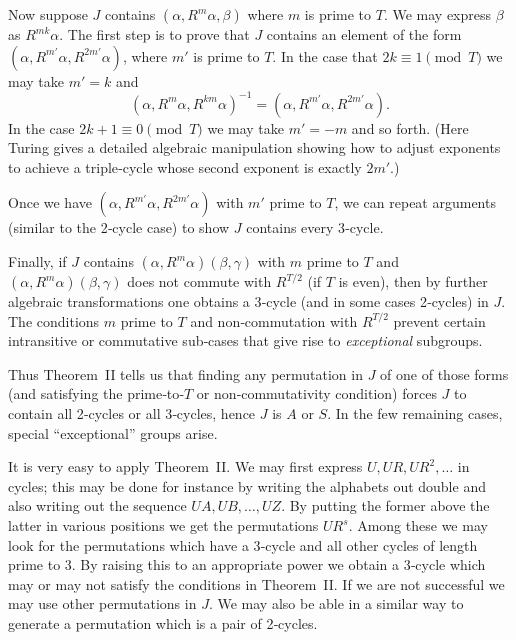 \documentclass[12pt]{article}
\begin{document}
\medskip

Now suppose $J$ contains $(\alpha, R^m \alpha, \beta)$ where $m$ is prime to $T$. We may express $\beta$ as $R^{mk}\alpha$. The first step is to prove that $J$ contains an element of the form $(\alpha, R^{m'}\alpha, R^{2m'}\alpha)$, where $m'$ is prime to $T$. In the case that $2k \equiv 1 \pmod{T}$ we may take $m' = k$ and 
\[
(\alpha, R^m\alpha, R^{km}\alpha)^{-1} = (\alpha, R^{m'}\alpha, R^{2m'}\alpha).
\]
In the case $2k + 1 \equiv 0 \pmod{T}$ we may take $m' = -m$ and so forth. 
(Here Turing gives a detailed algebraic manipulation showing how to adjust exponents to achieve a triple‐cycle whose second exponent is exactly $2m'$.)

\medskip

Once we have $(\alpha, R^{m'}\alpha, R^{2m'}\alpha)$ with $m'$ prime to $T$, we can repeat arguments (similar to the 2‐cycle case) to show $J$ contains every 3‐cycle. 

\medskip

Finally, if $J$ contains $(\alpha, R^m \alpha)(\beta, \gamma)$ with $m$ prime to $T$ and $(\alpha, R^m \alpha)(\beta, \gamma)$ does not commute with $R^{T/2}$ (if $T$ is even), then by further algebraic transformations one obtains a 3‐cycle (and in some cases 2‐cycles) in $J$. The conditions $m$ prime to $T$ and non‐commutation with $R^{T/2}$ prevent certain intransitive or commutative sub‐cases that give rise to {\em exceptional} subgroups.

\bigskip

Thus Theorem~II tells us that finding any permutation in $J$ of one of those forms (and satisfying the prime‐to‐$T$ or non‐commutativity condition) forces $J$ to contain all 2‐cycles or all 3‐cycles, hence $J$ is $A$ or $S$. In the few remaining cases, special “exceptional” groups arise.

\bigskip

It is very easy to apply Theorem~II. We may first express $U, UR, UR^2, \dots$ in cycles; this may be done for instance by writing the alphabets out double and also writing out the sequence $UA, UB, \dots, UZ$. By putting the former above the latter in various positions we get the permutations $UR^s$. Among these we may look for the permutations which have a 3‐cycle and all other cycles of length prime to 3. By raising this to an appropriate power we obtain a 3‐cycle which may or may not satisfy the conditions in Theorem~II. If we are not successful we may use other permutations in $J$. We may also be able in a similar way to generate a permutation which is a pair of 2‐cycles.
\end{document}
